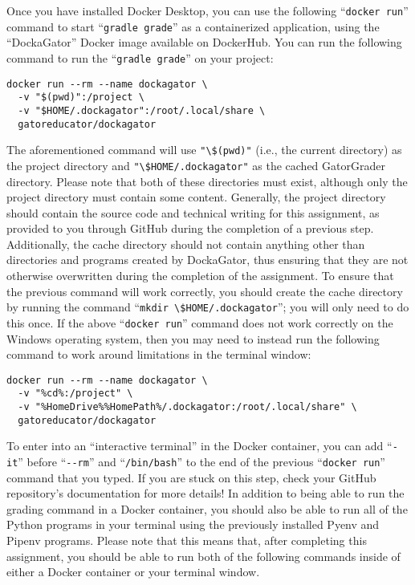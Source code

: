 \documentclass[11pt]{article}
\newcommand{\command}[1]{``\lstinline{#1}''}
\newcommand{\program}[1]{\lstinline{#1}}
\begin{document}
Once you have installed Docker Desktop, you can use the following
\command{docker run} command to start \command{gradle grade} as a containerized
application, using the ``DockaGator'' Docker image available on DockerHub. You
can run the following command to run the \command{gradle grade} on your project:

\begin{verbatim}
docker run --rm --name dockagator \
  -v "$(pwd)":/project \
  -v "$HOME/.dockagator":/root/.local/share \
  gatoreducator/dockagator
\end{verbatim}

The aforementioned command will use \program{"\$(pwd)"} (i.e., the current
directory) as the project directory and \program{"\$HOME/.dockagator"} as the
cached GatorGrader directory. Please note that both of these directories must
exist, although only the project directory must contain some content. Generally,
the project directory should contain the source code and technical writing for
this assignment, as provided to you through GitHub during the completion of a
previous step. Additionally, the cache directory should not contain anything
other than directories and programs created by DockaGator, thus ensuring that
they are not otherwise overwritten during the completion of the assignment. To
ensure that the previous command will work correctly, you should create the
cache directory by running the command \command{mkdir \$HOME/.dockagator}; you
will only need to do this once. If the above \command{docker run} command does
not work correctly on the Windows operating system, then you may need to instead
run the following command to work around limitations in the terminal window:

\begin{verbatim}
docker run --rm --name dockagator \
  -v "%cd%:/project" \
  -v "%HomeDrive%%HomePath%/.dockagator:/root/.local/share" \
  gatoreducator/dockagator
\end{verbatim}

To enter into an ``interactive terminal'' in the Docker container, you can add
\command{-it} before \command{--rm} and \command{/bin/bash} to the end of the
previous \command{docker run} command that you typed. If you are stuck on this
step, check your GitHub repository's documentation for more details!
%
In addition to being able to run the grading command in a Docker container, you
should also be able to run all of the Python programs in your terminal using the
previously installed Pyenv and Pipenv programs. Please note that this means
that, after completing this assignment, you should be able to run both of the
following commands inside of either a Docker container or your terminal window.
\end{document}
